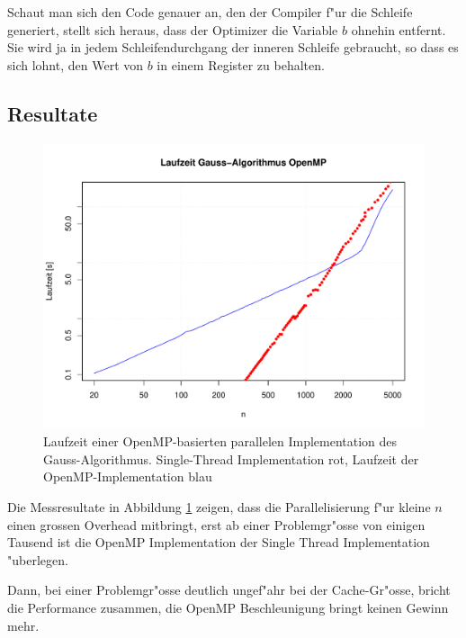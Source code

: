 Schaut man sich den Code genauer an, den der Compiler f"ur die Schleife
generiert, stellt sich heraus, dass der Optimizer die Variable $b$
ohnehin entfernt. Sie wird ja in jedem Schleifendurchgang der inneren
Schleife gebraucht, so dass es sich lohnt, den Wert von $b$ in einem
Register zu behalten.

\subsection{Resultate}
\begin{figure}
\begin{center}
\includegraphics[width=\hsize]{images/gauss-openmp.pdf}
\end{center}
\caption{Laufzeit einer OpenMP-basierten parallelen Implementation
des Gauss-Algorithmus.
Single-Thread Implementation rot, Laufzeit der OpenMP-Implementation
blau\label{openmp-performance}}
\end{figure}
Die Messresultate in Abbildung \ref{openmp-performance}
zeigen, dass die Parallelisierung f"ur kleine $n$
einen grossen Overhead mitbringt, erst ab einer Problemgr"osse von
einigen Tausend ist die OpenMP Implementation der Single Thread
Implementation "uberlegen.

Dann, bei einer Problemgr"osse deutlich ungef"ahr bei der Cache-Gr"osse,
bricht die Performance zusammen, die OpenMP Beschleunigung bringt
keinen Gewinn mehr.

